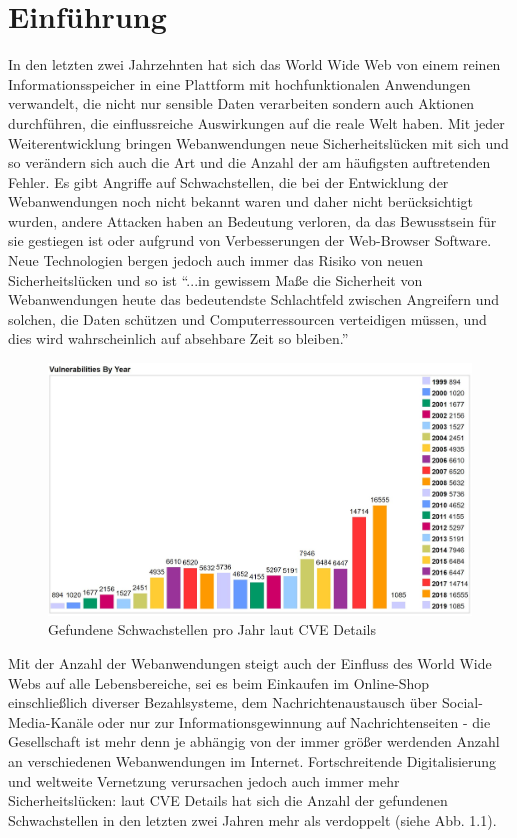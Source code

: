 \documentclass[12pt,oneside,a4paper,parskip,pointlessnumbers]{scrbook}
\begin{document}
\mainmatter

\chapter{Einführung}\label{ch:intro}
In den letzten zwei Jahrzehnten hat sich das World Wide Web von einem reinen Informationsspeicher in eine Plattform mit hochfunktionalen Anwendungen verwandelt, die nicht nur sensible Daten verarbeiten sondern auch  Aktionen durchführen, die einflussreiche Auswirkungen auf die reale Welt haben.
Mit jeder Weiterentwicklung bringen Webanwendungen neue Sicherheitslücken mit sich und so verändern sich auch die Art und die Anzahl der am häufigsten auftretenden Fehler. Es gibt Angriffe auf Schwachstellen, die bei der Entwicklung der Webanwendungen noch nicht bekannt waren und daher nicht berücksichtigt wurden, andere Attacken haben an Bedeutung verloren, da das Bewusstsein für sie gestiegen ist oder aufgrund von Verbesserungen der Web-Browser Software. Neue Technologien bergen jedoch auch immer das Risiko von neuen Sicherheitslücken und so ist ``...in gewissem Maße die Sicherheit von Webanwendungen heute das bedeutendste Schlachtfeld zwischen Angreifern und solchen, die Daten schützen und Computerressourcen verteidigen müssen, und dies wird wahrscheinlich auf absehbare Zeit so bleiben.'' \cite[S.6]{handbook}

\begin{figure}[htb!]
  \centering
    \includegraphics[width=1\textwidth]{Images/VulnByYear}
  \caption[Gefundene Schwachstellen pro Jahr laut CVE Details]{Gefundene Schwachstellen pro Jahr laut CVE Details \cite{cve}}
\end{figure}

Mit der Anzahl der Webanwendungen steigt auch der Einfluss des World Wide Webs auf alle Lebensbereiche, sei es beim Einkaufen im Online-Shop einschließlich diverser Bezahlsysteme, dem Nachrichtenaustausch über Social-Media-Kanäle oder nur zur Informationsgewinnung auf Nachrichtenseiten - die Gesellschaft ist mehr denn je abhängig von der immer größer werdenden Anzahl an verschiedenen Webanwendungen im Internet.
Fortschreitende Digitalisierung und weltweite Vernetzung verursachen jedoch auch immer mehr Sicherheitslücken: laut CVE Details hat sich die Anzahl der gefundenen Schwachstellen in den letzten zwei Jahren mehr als verdoppelt (siehe Abb. 1.1).
\end{document}
